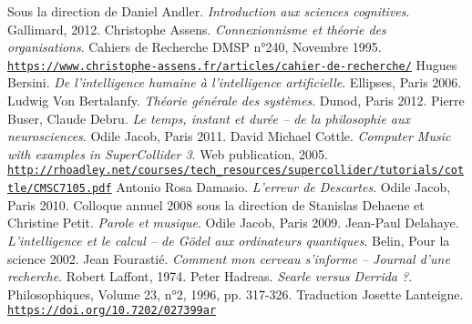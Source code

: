 \vspace{-1cm}
\renewcommand{\refname}{}
\makeatletter
\renewcommand\@biblabel[1]{}
\makeatother
\renewcommand\bibpreamble{$\rightarrow$ Here is the list of books, articles and  web pages that have been used in some way in the development of this work.\bigskip}

\begin{thebibliography}{99}
        		 
        \bibitem[-, 2012]{}Sous la direction de Daniel Andler. \textit{Introduction aux sciences cognitives}. Gallimard, 2012.
        \bibitem[-, 1995]{}Christophe Assens. \textit{Connexionnisme et théorie des organisations}. Cahiers de Recherche DMSP n°240, Novembre 1995.\\ \href{https://www.christophe-assens.fr/articles/cahier-de-recherche/}{\scriptsize{\texttt{https://www.christophe-assens.fr/articles/cahier-de-recherche/}}} \normalsize{}
        \bibitem[-, 2006]{}Hugues Bersini. \textit{De l'intelligence humaine à l'intelligence artificielle}. Ellipses, Paris 2006.
        \bibitem[-, 2012]{}Ludwig Von Bertalanfy. \textit{Théorie générale des systèmes}. Dunod, Paris 2012.
        \bibitem[-, 2011]{}Pierre Buser, Claude Debru. \textit{Le temps, instant et durée -- de la philosophie aux neurosciences}. Odile Jacob, Paris 2011.
        \bibitem[-, 2005]{}David Michael Cottle. \textit{Computer Music with examples in SuperCollider 3}. Web publication, 2005.\\ \href{http://rhoadley.net/courses/tech\_resources/supercollider/tutorials/cottle/CMSC7105.pdf}{\scriptsize{\texttt{http://rhoadley.net/courses/tech\_resources/supercollider/tutorials/cottle/CMSC7105.pdf}}} \normalsize{}
        \bibitem[-, 2010]{}Antonio Rosa Damasio. \textit{L'erreur de Descartes}. Odile Jacob, Paris 2010.
        \bibitem[-, 2009]{}Colloque annuel 2008 sous la direction de Stanislas Dehaene et Christine Petit. \textit{Parole et musique}. Odile Jacob, Paris 2009.
        \bibitem[-, 2002]{}Jean-Paul Delahaye. \textit{L'intelligence et le calcul -- de Gödel aux ordinateurs quantiques}. Belin, Pour la science 2002.
        \bibitem[-, 1974]{}Jean Fourastié. \textit{Comment mon cerveau s'informe -- Journal d'une recherche}. Robert Laffont, 1974.
                \bibitem[-, 1996]{}Peter Hadreas. \textit{Searle versus Derrida ?}. Philosophiques, Volume 23, n°2, 1996, pp. 317-326. Traduction Josette Lanteigne.\\ \href{https://doi.org/10.7202/027399ar}{\scriptsize{\texttt{https://doi.org/10.7202/027399ar}}} \normalsize{}


\end{thebibliography}
